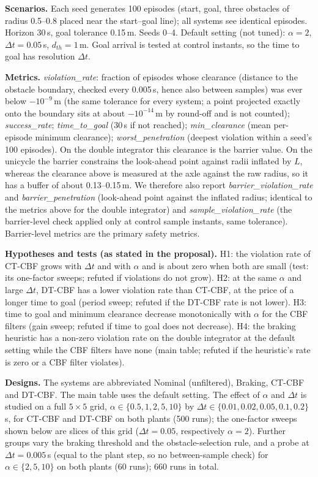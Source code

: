 \textbf{Scenarios.} Each seed generates 100 episodes (start, goal, three obstacles of radius 0.5--0.8 placed near the start--goal line); all systems see identical episodes. Horizon 30\,s, goal tolerance 0.15\,m. Seeds 0--4. Default setting (not tuned): $\alpha=2$, $\Delta t=0.05$\,s, $d_{th}=1$\,m. Goal arrival is tested at control instants, so the time to goal has resolution $\Delta t$.

\textbf{Metrics.} \emph{violation\_rate}: fraction of episodes whose clearance (distance to the obstacle boundary, checked every 0.005\,s, hence also between samples) was ever below $-10^{-9}$\,m (the same tolerance for every system; a point projected exactly onto the boundary sits at about $-10^{-14}$\,m by round-off and is not counted); \emph{success\_rate}; \emph{time\_to\_goal} (30\,s if not reached); \emph{min\_clearance} (mean per-episode minimum clearance); \emph{worst\_penetration} (deepest violation within a seed's 100 episodes). On the double integrator this clearance is the barrier value. On the unicycle the barrier constrains the look-ahead point against radii inflated by $L$, whereas the clearance above is measured at the axle against the raw radius, so it has a buffer of about 0.13--0.15\,m. We therefore also report \emph{barrier\_violation\_rate} and \emph{barrier\_penetration} (look-ahead point against the inflated radius; identical to the metrics above for the double integrator) and \emph{sample\_violation\_rate} (the barrier-level check applied only at control sample instants, same tolerance). Barrier-level metrics are the primary safety metrics.

\textbf{Hypotheses and tests (as stated in the proposal).} H1: the violation rate of CT-CBF grows with $\Delta t$ and with $\alpha$ and is about zero when both are small (test: its one-factor sweeps; refuted if violations do not grow). H2: at the same $\alpha$ and large $\Delta t$, DT-CBF has a lower violation rate than CT-CBF, at the price of a longer time to goal (period sweep; refuted if the DT-CBF rate is not lower). H3: time to goal and minimum clearance decrease monotonically with $\alpha$ for the CBF filters (gain sweep; refuted if time to goal does not decrease). H4: the braking heuristic has a non-zero violation rate on the double integrator at the default setting while the CBF filters have none (main table; refuted if the heuristic's rate is zero or a CBF filter violates).

\textbf{Designs.} The systems are abbreviated Nominal (unfiltered), Braking, CT-CBF and DT-CBF. The main table uses the default setting. The effect of $\alpha$ and $\Delta t$ is studied on a full $5\times5$ grid, $\alpha\in\{0.5,1,2,5,10\}$ by $\Delta t\in\{0.01,0.02,0.05,0.1,0.2\}$\,s, for CT-CBF and DT-CBF on both plants (500 runs); the one-factor sweeps shown below are slices of this grid ($\Delta t=0.05$, respectively $\alpha=2$). Further groups vary the braking threshold and the obstacle-selection rule, and a probe at $\Delta t=0.005$\,s (equal to the plant step, so no between-sample check) for $\alpha\in\{2,5,10\}$ on both plants (60 runs); 660 runs in total.

